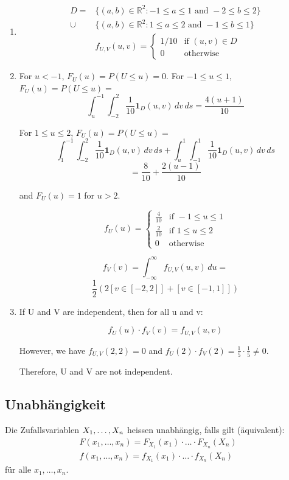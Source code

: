 \begin{enumerate}[noitemsep,topsep=0pt,parsep=0pt,partopsep=0pt]  
  \item 
\begin{align*}
  D =  & \{(a, b) \in \mathbb{R}^2 : -1 \leq a \leq 1 \text{ and } -2 \leq b \leq 2\} \\
  \cup & \{(a, b) \in \mathbb{R}^2 : 1 \leq a \leq 2 \text{ and } -1 \leq b \leq 1\}  \\
       & f_{U,V}(u, v) =
  \begin{cases}
    1/10 & \text{if } (u, v) \in D \\
    0    & \text{otherwise}
  \end{cases}
\end{align*}
\item For $u < -1$, $F_U(u) = P(U \leq u) = 0$.
For $-1 \leq u \leq 1$, $F_U(u) = P(U \leq u) = $
\[
  \int_u^{-1} \int_{-2}^{2} \frac{1}{10} \mathbf{1}_D(u, v) \, dv \, ds = \frac{4(u + 1)}{10}
\]

For $1 \leq u \leq 2$, $F_U(u) = P(U \leq u) =$
\[
  \int_1^{-1} \int_{-2}^{2} \frac{1}{10} \mathbf{1}_D(u, v) \, dv \, ds + \int_u^1 \int_{-1}^{1} \frac{1}{10} \mathbf{1}_D(u, v) \, dv \, ds
\]
\[
  = \frac{8}{10} + \frac{2(u - 1)}{10}
\]

and $F_U(u) = 1$ for $u > 2$.

\[
  f_U(u) = \begin{cases}
    \frac{4}{10} & \text{if } -1 \leq u \leq 1 \\
    \frac{2}{10} & \text{if } 1 \leq u \leq 2  \\
    0            & \text{otherwise}
  \end{cases}
\]

\[
  f_V(v) = \int_{-\infty}^{\infty} f_{U,V}(u,v) \, du =
\]
\[
  \frac{1}{2}\left(2[v \in [-2,2]] + [v \in [-1,1]]\right)
\]

\item If U and V are independent, then for all u and v:

\[
  f_U(u) \cdot f_V(v) = f_{U,V}(u,v)
\]

However, we have \(f_{U,V}(2,2) = 0\) and \(f_U(2) \cdot f_V(2) = \frac{1}{5}
\cdot \frac{1}{5} \neq 0\).

Therefore, U and V are not independent.
\end{enumerate}
\BoxEnd{}
\subsection{Unabhängigkeit}
Die Zufallsvariablen $X_1, \dots, X_n$ heissen unabhängig, falls gilt
(äquivalent):
\begin{align*}
  F (x_1, \dots, x_n) = F_{X_1} (x_1) \cdot \hdots \cdot F_{X_n} (X_n) \\
  f (x_1, \dots, x_n) = f_{X_1} (x_1) \cdot \hdots \cdot f_{X_n} (X_n)
\end{align*}
für alle $x_1, \dots, x_n$.
